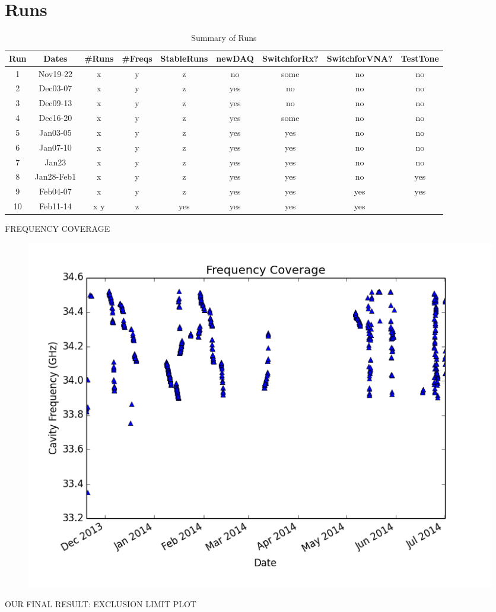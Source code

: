 \documentclass[11pt]{article}
\begin{document}
\section{Runs}

\begin{table}[ht]
\caption{Summary of Runs}

\begin{tabular}{c c c c c c c c c}
\hline\hline
Run & Dates & \#Runs & \#Freqs & StableRuns & newDAQ & SwitchforRx? & SwitchforVNA? & TestTone \\ [0.5ex]
\hline
1 & Nov19-22 & x & y & z & no & some & no & no \\
2 & Dec03-07 & x & y & z & yes & no & no & no \\
3 & Dec09-13 & x & y & z & yes & no & no & no \\
4 & Dec16-20 & x & y & z & yes & some & no & no \\
5 & Jan03-05 & x & y & z & yes & yes & no & no\\
6 & Jan07-10 & x & y & z & yes & yes & no & no \\
7 & Jan23 & x & y & z & yes & yes & no & no \\
8 & Jan28-Feb1 & x & y & z & yes & yes & no & yes \\
9 & Feb04-07 & x & y & z & yes & yes & yes & yes \\
10 & Feb11-14 & x y & z & yes & yes & yes & yes \\ [1ex]
\hline
\end{tabular}
\label{table:runsummary}
\end{table}

FREQUENCY COVERAGE
\begin{figure}
\includegraphics[scale=0.7]{frequencycoverage}
\end{figure}

OUR FINAL RESULT: EXCLUSION LIMIT PLOT
\end{document}
